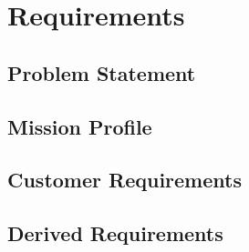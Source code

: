 \section{Requirements}
\subsection{Problem Statement}

\subsection{Mission Profile}

\subsection{Customer Requirements}

\subsection{Derived Requirements}